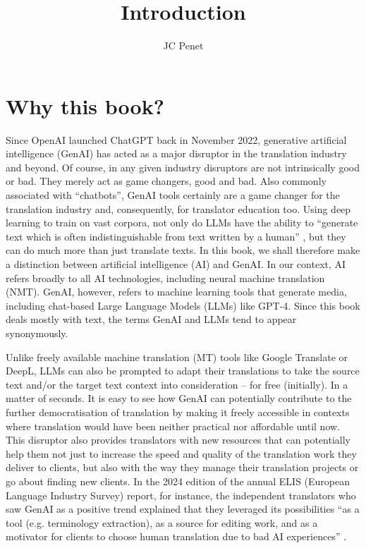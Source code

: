 \documentclass[output=paper]{langscibook}
\title{Introduction}
\author{JC Penet\orcid{}\affiliation{Newcastle University, United Kingdom}}
\begin{document}
\maketitle
\section{Why this book?}
Since OpenAI launched ChatGPT back in November 2022, generative artificial intelligence (GenAI) has acted as a major disruptor in the translation industry and beyond. Of course, in any given industry disruptors are not intrinsically good or bad. They merely act as game changers, good and bad. 
Also commonly associated with “chatbots”, GenAI tools certainly are a game changer for the translation industry and, consequently, for translator education too. Using deep learning to train on vast corpora, not only do LLMs have the ability to “generate text which is often indistinguishable from text written by a human” \citep[188]{moorkens_automating_2025}, but they can do much more than just translate texts. In this book, we shall therefore make a distinction between artificial intelligence (AI) and GenAI. In our context, AI refers broadly to all AI technologies, including neural machine translation (NMT). GenAI, however, refers to machine learning tools that generate media, including chat-based Large Language Models (LLMs) like GPT-4. Since this book deals mostly with text, the terms GenAI and LLMs tend to appear synonymously.

Unlike freely available machine translation (MT) tools like Google Translate or DeepL, LLMs can also be prompted to adapt their translations to take the source text and/or the target text context into consideration – for free (initially). In a matter of seconds. It is easy to see how GenAI can potentially contribute to the further democratisation of translation by making it freely accessible in contexts where translation would have been neither practical nor affordable until now. This disruptor also provides translators with new resources that can potentially help them not just to increase the speed and quality of the translation work they deliver to clients, but also with the way they manage their translation projects or go about finding new clients. In the 2024 edition of the annual ELIS (European Language Industry Survey) report, for instance, the independent translators who saw GenAI as a positive trend explained that they leveraged its possibilities “as a tool (e.g. terminology extraction), as a source for editing work, and as a motivator for clients to choose human translation due to bad AI experiences” \citep[24]{elis_elis_2024}.
\end{document}

